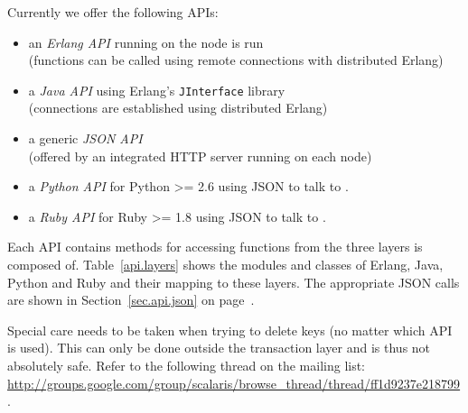 \documentclass[a4paper]{scrreprt}
\newcommand{\sieheref}[1]{\ref{#1} on page~\pageref{#1}}
\newcommand{\code}[1]{\lstinline[basicstyle=\ttfamily]!#1!}
\begin{document}
Currently we offer the following APIs:
\begin{itemize}
  \item an \emph{Erlang API} running on the node \scalaris{} is run\\
        (functions can be called using remote connections with distributed
        Erlang)
  \item a \emph{Java API} using Erlang's \code{JInterface} library\\
        (connections are established using distributed Erlang)
  \item a generic \emph{JSON API}\\
        (offered by an integrated HTTP server running on each \scalaris{} node)
  \item a \emph{Python API} for Python >= 2.6 using JSON to talk to \scalaris{}. 
  \item a \emph{Ruby API} for Ruby >= 1.8 using JSON to talk to \scalaris{}. 
\end{itemize}

Each API contains methods for accessing functions from the three layers
\scalaris{} is composed of.
Table~\ref{api.layers} shows the modules and classes of Erlang, Java, Python and Ruby
and their mapping to these layers. The appropriate JSON calls
are shown in Section~\sieheref{sec.api.json}.

Special care needs to be taken when trying to delete keys (no matter which API
is used). This can only be done outside the transaction layer and is thus not
absolutely safe. Refer to the following thread on the mailing list:
\url{http://groups.google.com/group/scalaris/browse_thread/thread/ff1d9237e218799}.
\end{document}
